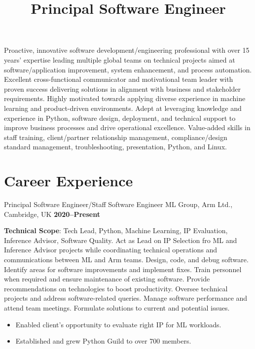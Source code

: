 \documentclass[10pt,a4paper,sans]{moderncv}
\title{Principal Software Engineer}
\begin{document}
\maketitle
Proactive, innovative software development/engineering
professional with over 15 years’ expertise leading multiple global teams on
technical projects aimed at software/application improvement, system
enhancement, and process automation. Excellent cross-functional communicator
and motivational team leader with proven success delivering solutions in
alignment with business and stakeholder requirements. Highly motivated towards
applying diverse experience in machine learning and product-driven
environments. Adept at leveraging knowledge and experience in Python, software
design, deployment, and technical support to improve business processes and
drive operational excellence. Value-added skills in staff training,
client/partner relationship management, compliance/design standard management,
troubleshooting, presentation, Python, and Linux.

\section{Career Experience}


\cventry{}
    {Principal Software Engineer/Staff Software Engineer}
    {ML Group, Arm Ltd., Cambridge, UK}
    {\textbf{2020--Present}}
    {}
    {\textbf{Technical Scope}: Tech Lead, Python, Machine Learning, IP
    Evaluation, Inference Advisor, Software Quality.\newline
    Act as Lead on IP Selection fro ML and Inference Advisor projects while
    coordinating technical operations and communications between ML and Arm
    teams. Design, code, and debug software. Identify areas for software
    improvements and implement fixes.
    Train personnel when required and ensure maintenance of existing
    software. Provide recommendations on technologies to boost productivity.
    Oversee technical projects and address software-related queries. Manage
    software performance and attend team meetings. Formulate solutions to
    current and potential issues.
    \begin{itemize}
        \item Enabled client’s opportunity to evaluate right IP for ML
            workloads.
        \item Established and grew Python Guild to over 700 members.
    \end{itemize}}
\end{document}

